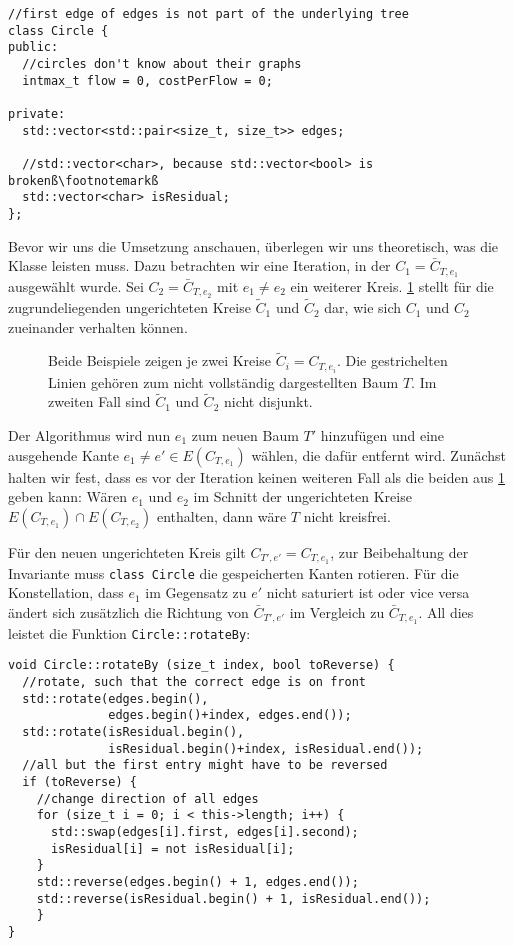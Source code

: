 \begin{lstlisting}[escapechar=ß]
//first edge of edges is not part of the underlying tree
class Circle {
public:
  //circles don't know about their graphs
  intmax_t flow = 0, costPerFlow = 0;

private:
  std::vector<std::pair<size_t, size_t>> edges;
  
  //std::vector<char>, because std::vector<bool> is brokenß\footnotemarkß
  std::vector<char> isResidual;
};
\end{lstlisting}

Bevor wir uns die Umsetzung anschauen, überlegen wir uns theoretisch, was die Klasse leisten muss. Dazu betrachten wir eine Iteration, in der $C_1=\bar{C}_{T,e_1}$ ausgewählt wurde. Sei $C_2=\bar{C}_{T,e_2}$ mit $e_1\neq e_2$ ein weiterer Kreis. \cref{fig:circles} stellt für die zugrundeliegenden ungerichteten Kreise $\tilde{C}_1$ und $\tilde{C}_2$ dar, wie sich $C_1$ und $C_2$ zueinander verhalten können.


\begin{figure}[!ht]\centering
    
    \caption{Beide Beispiele zeigen je zwei Kreise $\tilde{C}_i=C_{T,e_i}$. Die gestrichelten Linien gehören zum nicht vollständig dargestellten Baum $T$. Im zweiten Fall sind $\tilde{C}_1$ und $\tilde{C}_2$ nicht disjunkt.}
    \label{fig:circles}
\end{figure}

Der Algorithmus wird nun $e_1$ zum neuen Baum $T'$ hinzufügen und eine ausgehende Kante $e_1\neq e'\in E(C_{T,e_1})$ wählen, die dafür entfernt wird. Zunächst halten wir fest, dass es vor der Iteration keinen weiteren Fall als die beiden aus \cref{fig:circles} geben kann: Wären $e_1$ und $e_2$ im Schnitt der ungerichteten Kreise $E(C_{T,e_1})\cap E(C_{T,e_2})$ enthalten, dann wäre $T$ nicht kreisfrei.

Für den neuen ungerichteten Kreis gilt $C_{T',e'}=C_{T,e_1}$, zur Beibehaltung der Invariante muss \lstinline|class Circle| die gespeicherten Kanten rotieren. Für die Konstellation, dass $e_1$ im Gegensatz zu $e'$ nicht saturiert ist oder vice versa ändert sich zusätzlich die Richtung von $\bar{C}_{T',e'}$ im Vergleich zu $\bar{C}_{T,e_1}$. All dies leistet die Funktion \lstinline|Circle::rotateBy|:

\begin{lstlisting}
void Circle::rotateBy (size_t index, bool toReverse) {
  //rotate, such that the correct edge is on front
  std::rotate(edges.begin(),
              edges.begin()+index, edges.end());
  std::rotate(isResidual.begin(),
              isResidual.begin()+index, isResidual.end());
  //all but the first entry might have to be reversed
  if (toReverse) {
    //change direction of all edges
    for (size_t i = 0; i < this->length; i++) {
      std::swap(edges[i].first, edges[i].second);
      isResidual[i] = not isResidual[i];
    }
    std::reverse(edges.begin() + 1, edges.end());
    std::reverse(isResidual.begin() + 1, isResidual.end());
    }
}
\end{lstlisting}

